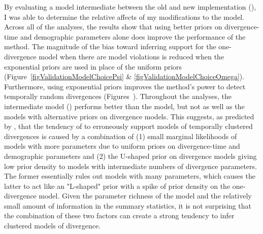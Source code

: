 By evaluating a model intermediate between the old and new implementation
(\modelUshaped), I was able to determine the relative affects of my 
modifications to the model.
Across all of the analyses, the results show that using better priors on
divergence-time and demographic parameters alone does improve the performance
of the method.
The magnitude of the bias toward inferring support for the one-divergence
model when there are model violations is reduced when the exponential
priors are used in place of the uniform priors
(Figure~\ref{figValidationModelChoicePsi} \&
\ref{figValidationModelChoiceOmega}).
Furthermore, using exponential priors improves the method's power to detect
temporally random divergences
(Figures~).
Throughout the analyses, the intermediate model (\modelUshaped) performs better
than the \msb model, but not as well as the models with alternative priors on
divergence models.
This suggests, as predicted by \cite{Oaks2012}, that the tendency of \msb to
erroneously support models of temporally clustered divergences is caused by a
combination of
(1) small marginal likelihoods of models with more \divTime{} parameters due to
uniform priors on divergence-time and demographic parameters and
(2) the U-shaped prior on divergence models giving low prior density to models
with intermediate numbers of divergence parameters.
The former essentially rules out models with many \divTime{} parameters, which
causes the latter to act like an "L-shaped" prior with a spike of
prior density on the one-divergence model.
Given the parameter richness of the model and the relatively small amount of
information in the summary statistics, it is not surprising that the
combination of these two factors can create a strong tendency to infer
clustered models of divergence.

